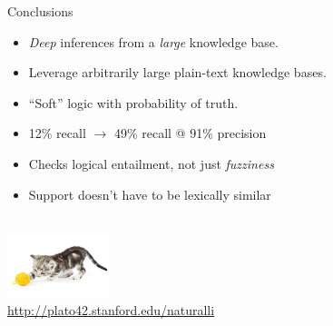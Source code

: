 \documentclass[hyperref]{beamer}
\begin{document}

\begin{frame}{Conclusions}
\begin{itemize}
  \item \textit{Deep} inferences from a \textit{large} knowledge base.
  \pause
  \item Leverage arbitrarily large plain-text knowledge bases.
  \pause
  \item ``Soft'' logic with probability of truth.
\end{itemize}
\vspace{0.5cm}
\pause

\begin{itemize}
  \item 12\% recall $\rightarrow$ 49\% recall @ 91\% precision
\end{itemize}
\vspace{0.25cm}
\pause

\begin{itemize}
  \item Checks logical entailment, not just \textit{fuzziness}
  \item Support doesn't have to be lexically similar
\end{itemize}
\pause
\end{frame}

\begin{frame}[noframenumbering]{}
\begin{center}
   \\
  \vspace{1cm}
  \includegraphics[width=3cm]{../../img/yarn-cat.jpg} \\
  \vspace{1cm}
  \url{http://plato42.stanford.edu/naturalli}
\end{center}
\end{frame}
\end{document}
